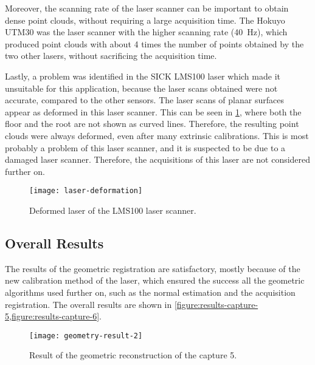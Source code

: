 Moreover, the scanning rate of the laser scanner can be important to obtain dense point clouds, without requiring a large acquisition time. The Hokuyo UTM30 was the laser scanner with the higher scanning rate (\SI{40}{\hertz}), which produced point clouds with about 4 times the number of points obtained by the two other lasers, without sacrificing the acquisition time.

Lastly, a problem was identified in the SICK LMS100 laser which made it unsuitable for this application, because the laser scans obtained were not accurate, compared to the other sensors. The laser scans of planar surfaces appear as deformed in this laser scanner. This can be seen in \cref{figure:deformed-laser}, where both the floor and the root are not shown as curved lines. Therefore, the resulting point clouds were always deformed, even after many extrinsic calibrations. This is most probably a problem of this laser scanner, and it is suspected to be due to a damaged laser scanner. Therefore, the acquisitions of this laser are not considered further on.

\begin{figure}[h]
    
    \centering
    \texttt{[image: laser-deformation]}

    \caption{Deformed laser of the LMS100 laser scanner.}
    \label{figure:deformed-laser}

\end{figure}

\subsection{Overall Results}

The results of the geometric registration are satisfactory, mostly because of the new calibration method of the laser, which ensured the success all the geometric algorithms used further on, such as the normal estimation and the acquisition registration. The overall results are shown in \cref{figure:results-capture-5,figure:results-capture-6}.


\begin{figure}[h]

    \centering
    \texttt{[image: geometry-result-2]}

    \caption{Result of the geometric reconstruction of the capture 5.}
    \label{figure:results-capture-5}
    
\end{figure}


